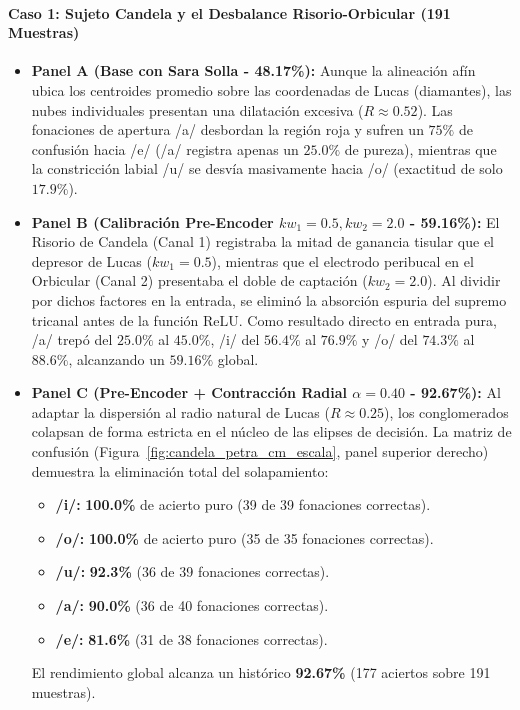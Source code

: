\documentclass[11pt,a4paper]{article}
\begin{document}
\paragraph{Caso 1: Sujeto Candela y el Desbalance Risorio-Orbicular (191 Muestras)}
\begin{itemize}
    \item \textbf{Panel A (Base con Sara Solla - 48.17\%):} Aunque la alineación afín ubica los centroides promedio sobre las coordenadas de Lucas (diamantes), las nubes individuales presentan una dilatación excesiva ($R \approx 0.52$). Las fonaciones de apertura /a/ desbordan la región roja y sufren un $75\%$ de confusión hacia /e/ (/a/ registra apenas un $25.0\%$ de pureza), mientras que la constricción labial /u/ se desvía masivamente hacia /o/ (exactitud de solo $17.9\%$).
    \item \textbf{Panel B (Calibración Pre-Encoder $kw_1=0.5, kw_2=2.0$ - 59.16\%):} El Risorio de Candela (Canal 1) registraba la mitad de ganancia tisular que el depresor de Lucas ($kw_1 = 0.5$), mientras que el electrodo peribucal en el Orbicular (Canal 2) presentaba el doble de captación ($kw_2 = 2.0$). Al dividir por dichos factores en la entrada, se eliminó la absorción espuria del supremo tricanal antes de la función $\text{ReLU}$. Como resultado directo en entrada pura, /a/ trepó del $25.0\%$ al $45.0\%$, /i/ del $56.4\%$ al $76.9\%$ y /o/ del $74.3\%$ al $88.6\%$, alcanzando un $59.16\%$ global.
    \item \textbf{Panel C (Pre-Encoder + Contracción Radial $\alpha=0.40$ - 92.67\%):} Al adaptar la dispersión al radio natural de Lucas ($R \approx 0.25$), los conglomerados colapsan de forma estricta en el núcleo de las elipses de decisión. La matriz de confusión (Figura~\ref{fig:candela_petra_cm_escala}, panel superior derecho) demuestra la eliminación total del solapamiento:
    \begin{itemize}
        \item \textbf{/i/:} \textbf{100.0\%} de acierto puro (39 de 39 fonaciones correctas).
        \item \textbf{/o/:} \textbf{100.0\%} de acierto puro (35 de 35 fonaciones correctas).
        \item \textbf{/u/:} \textbf{92.3\%} (36 de 39 fonaciones correctas).
        \item \textbf{/a/:} \textbf{90.0\%} (36 de 40 fonaciones correctas).
        \item \textbf{/e/:} \textbf{81.6\%} (31 de 38 fonaciones correctas).
    \end{itemize}
    El rendimiento global alcanza un histórico \textbf{92.67\%} (177 aciertos sobre 191 muestras).
\end{itemize}
\end{document}
